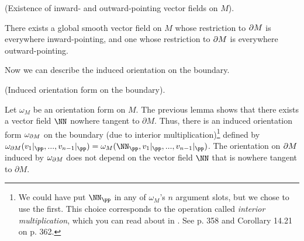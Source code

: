 \begin{lemma}
     (Existence of inward- and outward-pointing vector fields on $M$).
    
    There exists a global smooth vector field on $M$ whose restriction to $\partial M$ is everywhere inward-pointing, and one whose restriction to $\partial M$ is everywhere outward-pointing.
\end{lemma}

Now we can describe the induced orientation on the boundary.

\begin{theorem}
\label{ch::manifolds::induced_orientation_form_on_bdy}
     (Induced orientation form on the boundary).

    Let $\omega_M$ be an orientation form on $M$. The previous lemma shows that there exists a vector field $\NN$ nowhere tangent to $\partial M$. Thus, there is an induced orientation form $\omega_{\partial M}$ on the boundary (due to interior multiplication)\footnote{We could have put $\NN_\pp$ in any of $\omega_M$'s $n$ argument slots, but we chose to use the first. This choice corresponds to the operation called \textit{interior multiplication}, which you can read about in \cite{book::SM}. See p. 358 and Corollary 14.21 on p. 362.} defined by $\omega_{\pd M}(v_1|_\pp, ..., v_{n - 1}|_\pp) = \omega_M(\NN_\pp, v_1|_\pp, ..., v_{n - 1}|_\pp)$. The orientation on $\partial M$ induced by $\omega_{\partial M}$ does not depend on the vector field $\NN$ that is nowhere tangent to $\partial M$. 
\end{theorem}

